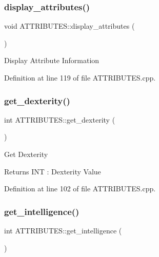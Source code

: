 \subsubsection{\texorpdfstring{display\_attributes()}{display\_attributes()}}
{\footnotesize\ttfamily void A\+T\+T\+R\+I\+B\+U\+T\+E\+S\+::display\+\_\+attributes (\begin{DoxyParamCaption}{ }\end{DoxyParamCaption})}



Display Attribute Information 



Definition at line 119 of file A\+T\+T\+R\+I\+B\+U\+T\+E\+S.\+cpp.

\mbox{\label{class_a_t_t_r_i_b_u_t_e_s_ac4b16d40bc6fbea609cf3c3bda5dd403}} 
\subsubsection{\texorpdfstring{get\_dexterity()}{get\_dexterity()}}
{\footnotesize\ttfamily int A\+T\+T\+R\+I\+B\+U\+T\+E\+S\+::get\+\_\+dexterity (\begin{DoxyParamCaption}{ }\end{DoxyParamCaption})}



Get Dexterity 

\begin{DoxyReturn}{Returns}
I\+NT \+: Dexterity Value
\end{DoxyReturn}


Definition at line 102 of file A\+T\+T\+R\+I\+B\+U\+T\+E\+S.\+cpp.

\mbox{\label{class_a_t_t_r_i_b_u_t_e_s_a4860d81830e28f8e8009f7212f1b347e}} 
\subsubsection{\texorpdfstring{get\_intelligence()}{get\_intelligence()}}
{\footnotesize\ttfamily int A\+T\+T\+R\+I\+B\+U\+T\+E\+S\+::get\+\_\+intelligence (\begin{DoxyParamCaption}{ }\end{DoxyParamCaption})}



